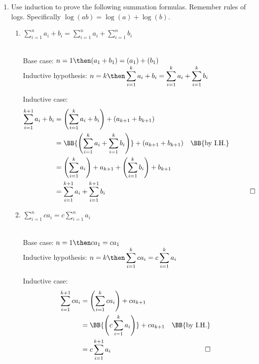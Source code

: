 \documentclass[basic, header]{nosvagor-notes}
\begin{document}
\begin{enumerate}[itemsep=4em]

  \item Use induction to prove the following summation formulas. Remember rules
    of logs. Specifically \(\log(ab) = \log(a) + \log(b)\).
    \begin{enumerate}[leftmargin=2em]
      \item \(\displaystyle \sum_{i=1}^{n} a_i + b_i = \sum_{i=1}^{n} a_i + \sum_{i=1}^{n} b_i  \)

        \\
        Base case: \(n = 1 \then
        (a_1 + b_1) = (a_1) + (b_1)\) \\
        Inductive hypothesis: \(\displaystyle
        n = k \then
        \sum_{i=1}^{k} a_i + b_i = \sum_{i=1}^{k} a_i + \sum_{i=1}^{k} b_i
        \)

        Inductive case:
        \begin{align*}
          \sum_{i=1}^{k+1} a_i + b_i
          &= \left(\sum_{i=1}^{k} a_i + b_i\right) + (a_{k+1} + b_{k+1}) \\
          &= \BB{\left(\sum_{i=1}^{k} a_i + \sum_{i=1}^{k} b_i\right)} + (a_{k+1} + b_{k+1})
          \quad  \text{\BB{by I.H.}}\\
          &= \left(\sum_{i=1}^{k} a_i \right) + a_{k+1} + \left(\sum_{i=1}^{k} b_i\right) + b_{k+1}\\
          &= \sum_{i=1}^{k+1} a_i + \sum_{i=1}^{k+1} b_i
          &\qed
        \end{align*}

      \item \(\displaystyle \sum_{i=1}^{n}ca_i = c \sum_{i=1}^{n} a_i \)

        \\
        Base case: \(n = 1 \then ca_1 = ca_1\)\\
        Inductive hypothesis: \(\displaystyle n = k
        \then
        \sum_{i=1}^{k} ca_i = c \sum_{i=1}^{k} a_i\)

        Inductive case:
        \begin{align*}
          \sum_{i=1}^{k+1} ca_i
           &= \left( \sum_{i=1}^{k} ca_i \right) + ca_{k+1}\\
           &= \BB{\left(c \sum_{i=1}^{k} a_i\right)} + ca_{k+1}
           & \text{\BB{by I.H.}} \\
           &= c \sum_{i=1}^{k+1} a_i & \qed
        \end{align*}


\end{enumerate}
\end{enumerate}
\end{document}
